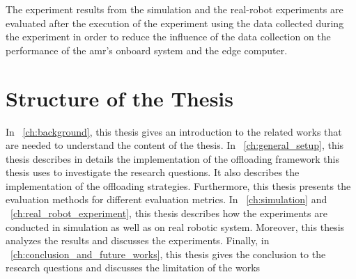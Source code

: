 The experiment results from the simulation and the real-robot experiments are evaluated after the execution of the experiment using the data collected during the experiment in order to reduce the influence of the data collection on the performance of the \gls{amr}'s onboard system and the edge computer.

\section{Structure of the Thesis}

In ~\cref{ch:background}, this thesis gives an introduction to the related works that are needed to understand the content of the thesis. In ~\cref{ch:general_setup}, this thesis describes in details the implementation of the offloading framework this thesis uses to investigate the research questions. It also describes the implementation of the offloading strategies. Furthermore, this thesis presents the evaluation methods for different evaluation metrics. In ~\cref{ch:simulation} and ~\cref{ch:real_robot_experiment}, this thesis describes how the experiments are conducted in simulation as well as on real robotic system. Moreover, this thesis analyzes the results and discusses the experiments. Finally, in ~\cref{ch:conclusion_and_future_works}, this thesis gives the conclusion to the research questions and discusses the limitation of the works 
